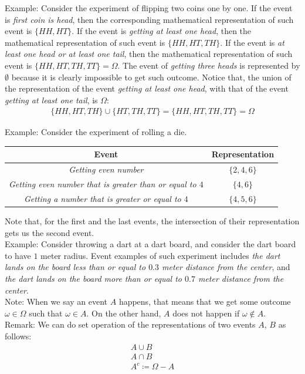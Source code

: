 \documentclass[11pt]{book}
\theoremstyle{break}
\theoremstyle{break}
\newcommand{\note}{\color{red}Note: \color{black}}
\newcommand{\remark}{\color{blue}Remark: \color{black}}
\newcommand{\example}{\color{green}Example: \color{black}}
\begin{document}
\example Consider the experiment of flipping two coins one by one. If the event is \textit{first coin is head}, then the corresponding mathematical representation of such event is $\{HH, HT\}$. If the event is \textit{getting at least one head}, then the mathematical representation of such event is $\{ HH, HT, TH\}$. If the event is \textit{at least one head or at least one tail}, then the mathematical representation of such event is $\{ HH, HT, TH, TT\} = \Omega$. The event of \textit{getting three heads} is represented by $\emptyset$ because it is clearly impossible to get such outcome. Notice that, the union of the representation of the event \textit{getting at least one head}, with that of the event \textit{getting at least one tail}, is $\Omega$:
\begin{align*}
\{ HH, HT, TH\} \cup \{ HT, TH, TT\} = \{ HH, HT, TH, TT\} = \Omega
\end{align*}

\newpage
\example Consider the experiment of rolling a die. 
\begin{center}
\begin{tabular}{|c|c|}
\hline
Event & Representation\\
\hline
\textit{Getting even number} & $\{2,4,6\}$\\
\hline
\textit{Getting even number that is greater than or equal to $4$} & $\{4,6\}$\\
\hline	
\textit{Getting a number that is greater or equal to $4$} & $\{4,5,6\}$\\
\hline
\end{tabular}
\end{center}
Note that, for the first and the last events, the intersection of their representation gets us the second event. \\

\example Consider throwing a dart at a dart board, and consider the dart board to have $1$ meter radius. Event examples of such experiment includes \textit{the dart lands on the board less than or equal to $0.3$ meter distance from the center}, and \textit{the dart lands on the board more than or equal to $0.7$ meter distance from the center}.\\

\note When we say an event $A$ happens, that means that we get some outcome $\omega \in \Omega$ such that $\omega \in A$. On the other hand, $A$ does not happen if $\omega \notin A$. \\

\remark We can do set operation of the representations of two events $A$, $B$ as follows:
\begin{align*}
A \cup B \tag{at least one of $A$ and $B$ happens}\\
A \cap B \tag{both $A$ and $B$ happens}\\
A^c \coloneqq \Omega-A \tag{$A$ does not happen}\\
\end{align*}
\end{document}
